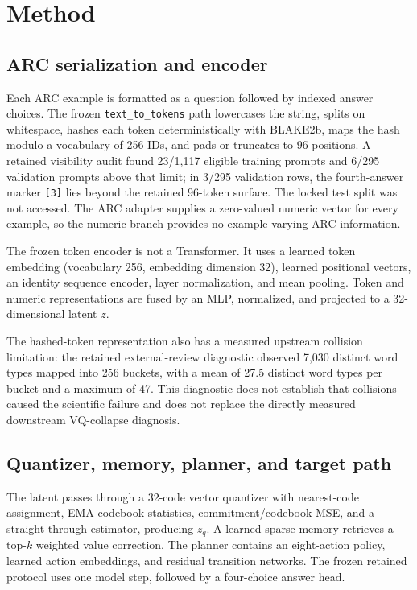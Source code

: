 \documentclass{article}
\begin{document}
\section{Method}
\subsection{ARC serialization and encoder}
Each ARC example is formatted as a question followed by indexed answer choices. The frozen \texttt{text\_to\_tokens} path lowercases the string, splits on whitespace, hashes each token deterministically with BLAKE2b, maps the hash modulo a vocabulary of 256 IDs, and pads or truncates to 96 positions. A retained visibility audit found 23/1,117 eligible training prompts and 6/295 validation prompts above that limit; in 3/295 validation rows, the fourth-answer marker \texttt{[3]} lies beyond the retained 96-token surface. The locked test split was not accessed. The ARC adapter supplies a zero-valued numeric vector for every example, so the numeric branch provides no example-varying ARC information.

The frozen token encoder is not a Transformer. It uses a learned token embedding (vocabulary 256, embedding dimension 32), learned positional vectors, an identity sequence encoder, layer normalization, and mean pooling. Token and numeric representations are fused by an MLP, normalized, and projected to a 32-dimensional latent $z$.

The hashed-token representation also has a measured upstream collision limitation: the retained external-review diagnostic observed 7,030 distinct word types mapped into 256 buckets, with a mean of 27.5 distinct word types per bucket and a maximum of 47. This diagnostic does not establish that collisions caused the scientific failure and does not replace the directly measured downstream VQ-collapse diagnosis.

\subsection{Quantizer, memory, planner, and target path}
The latent passes through a 32-code vector quantizer with nearest-code assignment, EMA codebook statistics, commitment/codebook MSE, and a straight-through estimator, producing $z_q$. A learned sparse memory retrieves a top-$k$ weighted value correction. The planner contains an eight-action policy, learned action embeddings, and residual transition networks. The frozen retained protocol uses one model step, followed by a four-choice answer head.
\end{document}
